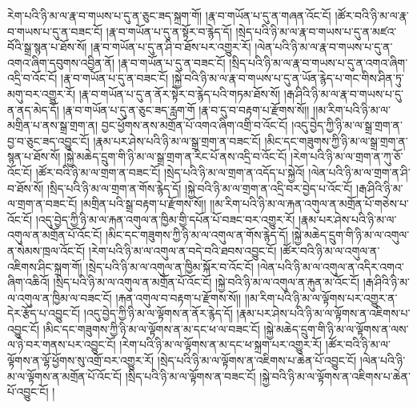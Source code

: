 རེག་པའི་ཉི་མ་ལ་རྣ་བ་གཡས་པ་དུ་ན་ཅུང་ཟད་སྐྲག་གོ། །རྣ་བ་གཡོན་པ་དུ་ན་གཞན་འོང་ངོ། །ཚོར་བའི་ཉི་མ་ལ་རྣ་བ་གཡས་པ་དུ་ན་བཟང་ངོ། །རྣ་བ་གཡོན་པ་དུ་ན་སྟོར་བ་རྙེད་དོ། །སྲེད་པའི་ཉི་མ་ལ་རྣ་བ་གཡས་པ་དུ་ན་མཛའ་བོའི་སྒྲ་སྙན་པ་ཐོས་སོ། །རྣ་བ་གཡོན་པ་དུ་ན་ཤི་བ་ཐོས་པར་འགྱུར་རོ། །ལེན་པའི་ཉི་མ་ལ་རྣ་བ་གཡས་པ་དུ་ན་འགའ་ཞིག་དབུགས་འབྱིན་ནོ། །རྣ་བ་གཡོན་པ་དུ་ན་བཟང་ངོ། །སྲིད་པའི་ཉི་མ་ལ་རྣ་བ་གཡས་པ་དུ་ན་འགའ་ཞིག་འདྲི་བ་འོང་ངོ། །རྣ་བ་གཡོན་པ་དུ་ན་བཟང་ངོ། །སྐྱེ་བའི་ཉི་མ་ལ་རྣ་བ་གཡས་པ་དུ་ན་ཡོན་རྙེད་པ་གང་གིས་ཤིན་ཏུ་མགུ་བར་འགྱུར་རོ། །རྣ་བ་གཡོན་པ་དུ་ན་ནོར་སྟེར་བ་རྙེད་པའི་གཏམ་ཐོས་སོ། །རྒ་ཤིའི་ཉི་མ་ལ་རྣ་བ་གཡས་པ་དུ་ན་ནད་མེད་དོ། །རྣ་བ་གཡོན་པ་དུ་ན་ཅུང་ཟད་རླག་གོ །རྣ་བ་དུ་བ་བརྟག་པ་རྫོགས་སོ།། །།མ་རིག་པའི་ཉི་མ་ལ་མགྲིན་པ་ནས་སྒྲ་གྲག་ན། བྱང་ཕྱོགས་ནས་མགྲོན་པོ་འགའ་ཞིག་འགྲི་བ་འོང་ངོ། །འདུ་བྱེད་ཀྱི་ཉི་མ་ལ་སྒྲ་གྲག་ན་བྱ་བ་ཅུང་ཟད་འབྱུང་ངོ། །རྣམ་པར་ཤེས་པའི་ཉི་མ་ལ་སྒྲ་གྲག་ན་བཟང་ངོ། །མིང་དང་གཟུགས་ཀྱི་ཉི་མ་ལ་སྒྲ་གྲག་ན་སྙན་པ་ཐོས་སོ། །སྐྱེ་མཆེད་དྲུག་གི་ཉི་མ་ལ་སྒྲ་གྲག་ན་རིང་པོ་ནས་འདྲི་བ་འོང་ངོ། །རེག་པའི་ཉི་མ་ལ་གྲག་ན་ཀུ་ཅོ་འོང་ངོ། །ཚོར་བའི་ཉི་མ་ལ་གྲག་ན་བཟང་ངོ། །སྲེད་པའི་ཉི་མ་ལ་གྲག་ན་འདོད་པ་སྐྱེའོ། །ལེན་པའི་ཉི་མ་ལ་གྲག་ན་ཤི་བ་ཐོས་སོ། །སྲིད་པའི་ཉི་མ་ལ་གྲག་ན་གོས་རྙེད་དོ། །སྐྱེ་བའི་ཉི་མ་ལ་གྲག་ན་འདྲི་བར་བྱེད་པ་འོང་ངོ། །རྒ་ཤིའི་ཉི་མ་ལ་གྲག་ན་བཟང་ངོ། །མགྲིན་པའི་སྒྲ་བརྟག་པ་རྫོགས་སོ།། །།མ་རིག་པའི་ཉི་མ་ལ་རྐན་འགུལ་ན་མགྲོན་པོ་གཅེས་པ་འོང་ངོ། །འདུ་བྱེད་ཀྱི་ཉི་མ་ལ་རྐན་འགུལ་ན་ཁྱིམ་གྱི་དཔོན་པོ་བཟང་བར་འགྱུར་རོ། །རྣམ་པར་ཤེས་པའི་ཉི་མ་ལ་འགུལ་ན་མགྲོན་པོ་འོང་ངོ། །མིང་དང་གཟུགས་ཀྱི་ཉི་མ་ལ་འགུལ་ན་གོས་རྙེད་དོ། །སྐྱེ་མཆེད་དྲུག་གི་ཉི་མ་ལ་འགུལ་ན་སེམས་ཁྲལ་འོང་ངོ། །རེག་པའི་ཉི་མ་ལ་འགུལ་ན་བདེ་བའི་ཐབས་འབྱུང་ངོ། །ཚོར་བའི་ཉི་མ་ལ་འགུལ་ན་འཇིགས་ཤིང་སྐྲག་གོ། །སྲེད་པའི་ཉི་མ་ལ་འགུལ་ན་ཁྱིམ་སྐོར་བ་འོང་ངོ། །ལེན་པའི་ཉི་མ་ལ་འགུལ་ན་འདིར་འགའ་ཞིག་འཆིའོ། །སྲིད་པའི་ཉི་མ་ལ་འགུལ་ན་མགྲོན་པོ་འོང་ངོ། །སྐྱེ་བའི་ཉི་མ་ལ་འགུལ་ན་རྐུན་མ་འོང་ངོ། །རྒ་ཤིའི་ཉི་མ་ལ་འགུལ་ན་ཁྱིམ་ལ་བཟང་ངོ། །རྐན་འགུལ་བ་བརྟག་པ་རྫོགས་སོ།། །།མ་རིག་པའི་ཉི་མ་ལ་ལྟོགས་པར་འགྱུར་ན་དེར་རྩོད་པ་འབྱུང་ངོ། །འདུ་བྱེད་ཀྱི་ཉི་མ་ལ་ལྟོགས་ན་ནོར་རྙེད་དོ། །རྣམ་པར་ཤེས་པའི་ཉི་མ་ལ་ལྟོགས་ན་འཇིགས་པ་འབྱུང་ངོ། །མིང་དང་གཟུགས་ཀྱི་ཉི་མ་ལ་ལྟོགས་ན་མ་དང་ཕ་ལ་བཟང་ངོ། །སྐྱེ་མཆེད་དྲུག་གི་ཉི་མ་ལ་ལྟོགས་ན་ལས་ལ་ཉེ་བར་གནས་པར་འབྱུང་ངོ། །རེག་པའི་ཉི་མ་ལ་ལྟོགས་ན་མ་དང་ཕ་སྐྲག་པར་འགྱུར་རོ། །ཚོར་བའི་ཉི་མ་ལ་ལྟོགས་ན་ལྷོ་ཕྱོགས་སུ་འགྲོ་བར་འགྱུར་རོ། །སྲེད་པའི་ཉི་མ་ལ་ལྟོགས་ན་འཇིགས་པ་ཆེན་པོ་འབྱུང་ངོ། །ལེན་པའི་ཉི་མ་ལ་ལྟོགས་ན་མགྲོན་པོ་འོང་ངོ། །སྲིད་པའི་ཉི་མ་ལ་ལྟོགས་ན་བཟང་ངོ། །སྐྱེ་བའི་ཉི་མ་ལ་ལྟོགས་ན་འཇིགས་པ་ཆེན་པོ་འབྱུང་ངོ། །
